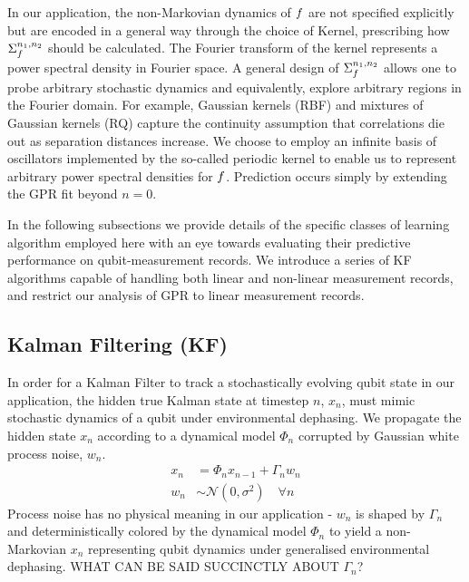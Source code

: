 In our application, the non-Markovian dynamics of $f$ are not specified explicitly but are encoded in a general way through the choice of Kernel, prescribing how $\Sigma_f^{n_1, n_2}$ should be calculated. The Fourier transform of the kernel represents a power spectral density in Fourier space. A general design of $\Sigma_f^{n_1, n_2}$ allows one to probe arbitrary stochastic dynamics and equivalently, explore arbitrary regions in the Fourier domain. For example, Gaussian kernels (RBF) and mixtures of Gaussian kernels (RQ) capture the continuity assumption that correlations die out as separation distances increase. We choose to employ an infinite basis of oscillators implemented by the so-called periodic kernel to enable us to represent arbitrary power spectral densities for $f$.  Prediction occurs simply by extending the GPR fit beyond $n=0$.

In the following subsections we provide details of the specific classes of learning algorithm employed here with an eye towards evaluating their predictive performance on qubit-measurement records.  We introduce a series of KF algorithms capable of handling both linear and non-linear measurement records, and restrict our analysis of GPR to linear measurement records. 



\subsection{ Kalman Filtering (KF)}\label{Subsec:KF}

In order for a Kalman Filter to track a stochastically evolving qubit state in our application, the hidden true Kalman state at timestep $n$, $x_n$, must mimic stochastic dynamics of a qubit under environmental dephasing. We propagate the hidden state $x_n$ according to a dynamical model $\Phi_n$ corrupted by Gaussian white process noise, $w_n$.  
\begin{align}
x_n & = \Phi_n x_{n-1} + \Gamma_n w_n \label{eqn:KF:dynamics} \\
w_n & \sim \mathcal{N}(0, \sigma^2) \quad \forall n 
\end{align}
Process noise has no physical meaning in our application - $w_n$ is shaped by $\Gamma_n$ and deterministically colored by the dynamical model $\Phi_n$ to yield a non-Markovian $x_n$ representing qubit dynamics under generalised environmental dephasing.  WHAT CAN BE SAID SUCCINCTLY ABOUT $\Gamma_n$?

